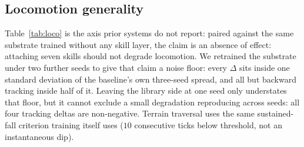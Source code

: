 \documentclass[letterpaper, 10 pt, conference]{ieeeconf}  %
\begin{document}
\subsection{Locomotion generality}

Table~\ref{tab:loco} is the axis prior systems do not report: paired against
the same substrate trained without any skill layer, the claim is an absence
of effect: attaching seven skills should not degrade locomotion. We retrained the substrate under two
further seeds to give that claim a noise floor: every $\Delta$ sits inside one
standard deviation of the baseline's own three-seed spread, and all but
backward tracking inside half of it. Leaving the library side at one seed only understates that floor, but it
cannot exclude a small degradation reproducing across seeds: all four tracking
deltas are non-negative. Terrain traversal
uses the same sustained-fall criterion training itself uses ($10$
consecutive ticks below threshold, not an instantaneous dip).
\end{document}
